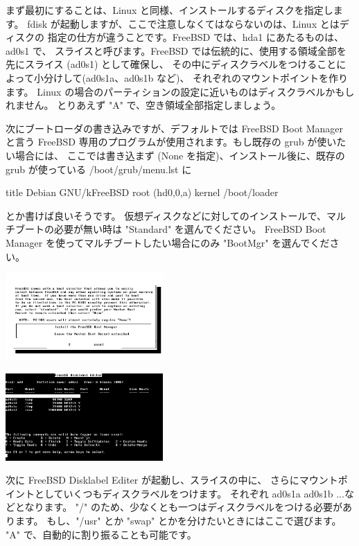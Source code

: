\documentclass[mingoth,a4paper]{jsarticle}
\begin{document}
まず最初にすることは、Linux と同様、インストールするディスクを指定します。
fdisk が起動しますが、ここで注意しなくてはならないのは、Linux とはディスクの
指定の仕方が違うことです。FreeBSD では、hda1 にあたるものは、ad0s1 で、
スライスと呼びます。FreeBSD では伝統的に、使用する領域全部を先にスライス (ad0s1) として確保し、
その中にディスクラベルをつけることによって小分けして(ad0s1a、ad0s1b など)、
それぞれのマウントポイントを作ります。
Linux の場合のパーティションの設定に近いものはディスクラベルかもしれません。
とりあえず "A" で、空き領域全部指定しましょう。

次にブートローダの書き込みですが、デフォルトでは FreeBSD Boot Manager と言う
 FreeBSD 専用のプログラムが使用されます。もし既存の grub が使いたい場合には、
ここでは書き込まず (None を指定)、インストール後に、既存の grub が使っている 
/boot/grub/menu.lst に
\begin{commandline}
title Debian GNU/kFreeBSD
root (hd0,0,a)
kernel /boot/loader
\end{commandline}
とか書けば良いそうです。
仮想ディスクなどに対してのインストールで、マルチブートの必要が無い時は "Standard" を選んでください。
FreeBSD Boot Manager を使ってマルチブートしたい場合にのみ "BootMgr" を選んでください。

\begin{minipage}{0.4\hsize}
\includegraphics[width=6cm]{image200906/kfreebsd04_mono.png}
\end{minipage}
\begin{minipage}{0.4\hsize}
\includegraphics[width=6cm]{image200906/kfreebsd05_mono.png}
\end{minipage}

次に FreeBSD Disklabel Editer が起動し、スライスの中に、
さらにマウントポイントとしていくつもディスクラベルをつけます。
それぞれ ad0s1a ad0s1b ...などとなります。
"/" のため、少なくとも一つはディスクラベルをつける必要があります。
もし、"/usr" とか "swap" とかを分けたいときにはここで選びます。
"A" で、自動的に割り振ることも可能です。
\end{document}

